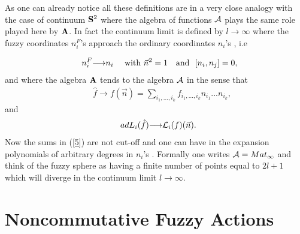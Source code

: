 \documentclass[a4paper,10pt]{article}
\begin{document}
As one can already notice all these definitions are in a very close analogy with the case of continuum ${\bf S}^2$
where the algebra of functions ${\cal A}$ plays the same role played here by ${\bf A}$. In fact the continuum limit
is defined by $l{\longrightarrow}{\infty}$ where the fuzzy coordinates $n_i^F$'s approach the ordinary coordinates
$n_i$'s , i.e

\begin{eqnarray}
&&{n}^F_{i}{\longrightarrow}n_i~~~~{\rm with}~ \vec{n}^2=1~~~{\rm and}~~ [n_i,n_j]=0,\nonumber\\
\end{eqnarray}
and where the algebra ${\bf A}$ tends to the algebra ${\cal A}$ in the sense that
\begin{eqnarray}
&&\hat{f}{\longrightarrow}f(\vec{n})=\sum_{i_1,...,i_k}f_{i_1,...,i_k}n_{i_1}...n_{i_k},\label{5}
\end{eqnarray}
and
\begin{eqnarray}
~~adL_i(\hat{f}){\longrightarrow}{\cal L}_i(f)(\vec{n}).
\end{eqnarray}
Now the sums in  (\ref{5}) are not cut-off and one can have in the expansion polynomials of arbitrary degrees in
$n_i$'s . Formally one writes ${\cal A}=Mat_{\infty}$ and think of the fuzzy sphere as having a finite number of
points equal to $2l+1$ which will diverge in the continuum limit $l{\longrightarrow}{\infty}$.

\section{Noncommutative Fuzzy Actions}
\end{document}
